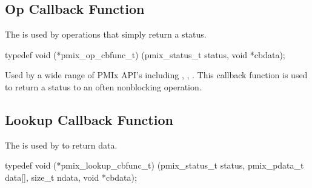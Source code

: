 \subsection{Op Callback Function}

\summary

The  is used by operations that simply return a status.

\cspecificstart
\begin{codepar}
typedef void (*pmix_op_cbfunc_t)
    (pmix_status_t status, void *cbdata);
\end{codepar}
\cspecificend

\begin{arglist}
\end{arglist}

\descr

Used by a wide range of \ac{PMIx} API's including , , .
This callback function is used to return a status to an often nonblocking operation.


\subsection{Lookup Callback Function}

\summary

The  is used by  to return data.

\cspecificstart
\begin{codepar}
typedef void (*pmix_lookup_cbfunc_t)
    (pmix_status_t status,
     pmix_pdata_t data[], size_t ndata,
     void *cbdata);
\end{codepar}
\cspecificend

\begin{arglist}
\end{arglist}


\descr

